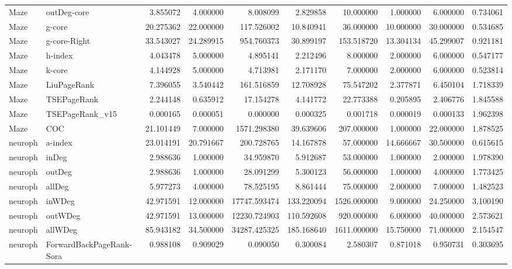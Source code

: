 \begin{tabular}{llrrrrrrrr}
Maze & outDeg-core & 3.855072 & 4.000000 & 8.008099 & 2.829858 & 10.000000 & 1.000000 & 6.000000 & 0.734061 \\
Maze & g-core & 20.275362 & 22.000000 & 117.526002 & 10.840941 & 36.000000 & 10.000000 & 30.000000 & 0.534685 \\
Maze & g-core-Right & 33.543027 & 24.289915 & 954.760373 & 30.899197 & 153.518720 & 13.304134 & 45.299007 & 0.921181 \\
Maze & h-index & 4.043478 & 5.000000 & 4.895141 & 2.212496 & 8.000000 & 2.000000 & 6.000000 & 0.547177 \\
Maze & k-core & 4.144928 & 5.000000 & 4.713981 & 2.171170 & 7.000000 & 2.000000 & 6.000000 & 0.523814 \\
Maze & LiuPageRank & 7.396055 & 3.540442 & 161.516859 & 12.708928 & 75.547202 & 2.377871 & 6.450104 & 1.718339 \\
Maze & TSEPageRank & 2.244148 & 0.635912 & 17.154278 & 4.141772 & 22.773388 & 0.205895 & 2.406776 & 1.845588 \\
Maze & TSEPageRank_v15 & 0.000165 & 0.000051 & 0.000000 & 0.000325 & 0.001718 & 0.000019 & 0.000133 & 1.962398 \\
Maze & COC & 21.101449 & 7.000000 & 1571.298380 & 39.639606 & 207.000000 & 1.000000 & 22.000000 & 1.878525 \\
neuroph & a-index & 23.014191 & 20.791667 & 200.728765 & 14.167878 & 57.000000 & 14.666667 & 30.500000 & 0.615615 \\
neuroph & inDeg & 2.988636 & 1.000000 & 34.959870 & 5.912687 & 53.000000 & 1.000000 & 2.000000 & 1.978390 \\
neuroph & outDeg & 2.988636 & 1.000000 & 28.091299 & 5.300123 & 56.000000 & 1.000000 & 4.000000 & 1.773425 \\
neuroph & allDeg & 5.977273 & 4.000000 & 78.525195 & 8.861444 & 75.000000 & 2.000000 & 7.000000 & 1.482523 \\
neuroph & inWDeg & 42.971591 & 12.000000 & 17747.593474 & 133.220094 & 1526.000000 & 9.000000 & 24.250000 & 3.100190 \\
neuroph & outWDeg & 42.971591 & 13.000000 & 12230.724903 & 110.592608 & 920.000000 & 6.000000 & 40.000000 & 2.573621 \\
neuroph & allWDeg & 85.943182 & 34.500000 & 34287.425325 & 185.168640 & 1611.000000 & 15.750000 & 71.000000 & 2.154547 \\
neuroph & ForwardBackPageRank-Sora & 0.988108 & 0.909029 & 0.090050 & 0.300084 & 2.580307 & 0.871018 & 0.950731 & 0.303695 \\

\end{tabular}
